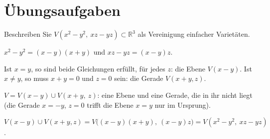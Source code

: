 \section{Übungsaufgaben}

\begin{aufgabe}
Beschreiben Sie $V(x^{2} - y^{2},\ xz - yz)\subset\mathbb R^{3}$ als Vereinigung einfacher Varietäten.

\loesung
{}
$x^{2} - y^{2} = (x-y)(x+y)$ und $xz - yz = (x-y)z$.

Ist $x = y$, so sind beide Gleichungen erfüllt, für jedes $z$: die Ebene $V(x - y)$. Ist $x\ne y$, so muss $x + y = 0$ und $z = 0$ sein: die Gerade $V(x + y, z)$.

$V = V(x - y)\cup V(x + y,\ z)$: eine Ebene und eine Gerade, die in ihr nicht liegt (die Gerade $x = -y$, $z = 0$ trifft die Ebene $x = y$ nur im Ursprung).

$V(x-y)\cup V(x+y, z) = V\bigl((x-y)(x+y),\ (x-y)z\bigr) = V(x^{2}-y^{2},\ xz-yz)$. \checkmark

\begin{center}
\begin{minipage}{0.88\textwidth}
\end{minipage}
\end{center}
\end{aufgabe}

